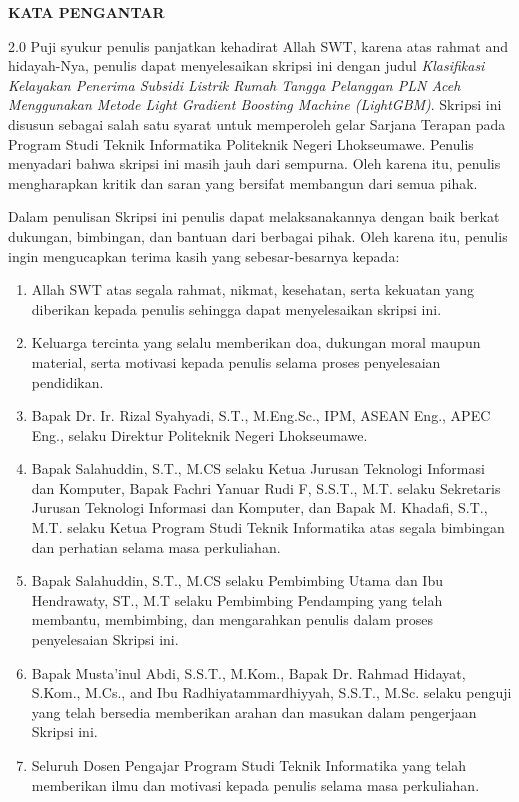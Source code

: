 \documentclass[12pt, a4paper, onecolumn, oneside]{report}
\begin{document}
\newpage
{}
{}
\begin{center}
{\fontsize{14pt}{16pt}\selectfont\bfseries KATA PENGANTAR}
\end{center}
\vspace{0.5cm}

\begin{spacing}{2.0}
\noindent Puji syukur penulis panjatkan kehadirat Allah SWT, karena atas rahmat and hidayah-Nya, penulis dapat menyelesaikan skripsi ini dengan judul \textit{Klasifikasi Kelayakan Penerima Subsidi Listrik Rumah Tangga Pelanggan PLN Aceh Menggunakan Metode Light Gradient Boosting Machine (LightGBM)}. Skripsi ini disusun sebagai salah satu syarat untuk memperoleh gelar Sarjana Terapan pada Program Studi Teknik Informatika Politeknik Negeri Lhokseumawe. Penulis menyadari bahwa skripsi ini masih jauh dari sempurna. Oleh karena itu, penulis mengharapkan kritik dan saran yang bersifat membangun dari semua pihak.

\noindent Dalam penulisan Skripsi ini penulis dapat melaksanakannya dengan baik berkat dukungan, bimbingan, dan bantuan dari berbagai pihak. Oleh karena itu, penulis ingin mengucapkan terima kasih yang sebesar-besarnya kepada:
\begin{enumerate}
    \item Allah SWT atas segala rahmat, nikmat, kesehatan, serta kekuatan yang diberikan kepada penulis sehingga dapat menyelesaikan skripsi ini.
    \item Keluarga tercinta yang selalu memberikan doa, dukungan moral maupun material, serta motivasi kepada penulis selama proses penyelesaian pendidikan.
    \item Bapak Dr. Ir. Rizal Syahyadi, S.T., M.Eng.Sc., IPM, ASEAN Eng., APEC Eng., selaku Direktur Politeknik Negeri Lhokseumawe.
    \item Bapak Salahuddin, S.T., M.CS selaku Ketua Jurusan Teknologi Informasi dan Komputer, Bapak Fachri Yanuar Rudi F, S.S.T., M.T. selaku Sekretaris Jurusan Teknologi Informasi dan Komputer, dan Bapak M. Khadafi, S.T., M.T. selaku Ketua Program Studi Teknik Informatika atas segala bimbingan dan perhatian selama masa perkuliahan.
    \item Bapak Salahuddin, S.T., M.CS selaku Pembimbing Utama dan Ibu Hendrawaty, ST., M.T selaku Pembimbing Pendamping yang telah membantu, membimbing, dan mengarahkan penulis dalam proses penyelesaian Skripsi ini.
    \item Bapak Musta'inul Abdi, S.S.T., M.Kom., Bapak Dr. Rahmad Hidayat, S.Kom., M.Cs., and Ibu Radhiyatammardhiyyah, S.S.T., M.Sc. selaku penguji yang telah bersedia memberikan arahan dan masukan dalam pengerjaan Skripsi ini.
    \item Seluruh Dosen Pengajar Program Studi Teknik Informatika yang telah memberikan ilmu dan motivasi kepada penulis selama masa perkuliahan.
\end{enumerate}


\end{spacing}
\end{document}
